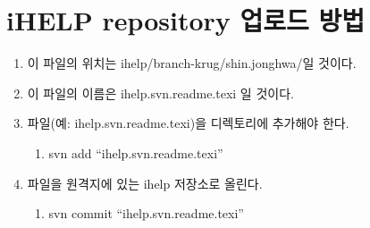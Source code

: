 \documentclass[,noae]{report}
\begin{document}
\section{iHELP repository 업로드 방법}
\begin{enumerate}
\item 이 파일의 위치는 ihelp/branch-krug/shin.jonghwa/일 것이다.
\item 이 파일의 이름은 ihelp.svn.readme.texi 일 것이다.
\item 파일(예: ihelp.svn.readme.texi)을 디렉토리에 추가해야 한다.

\begin{enumerate}
\item svn add ``ihelp.svn.readme.texi''
\end{enumerate}
\item 파일을 원격지에 있는 ihelp 저장소로 올린다.

\begin{enumerate}
\item svn commit ``ihelp.svn.readme.texi''\end{enumerate}
\end{enumerate}
\end{document}
